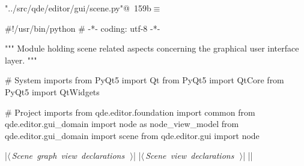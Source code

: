 \documentclass[%
    a4paper,    %
    justified,  %
    nobib,      %
    openany     %
]{tufte-book}
\begin{document}
\begin{flushleft} \small
\begin{minipage}{\linewidth}\label{scrap174}\raggedright\small
{} \verb@"../src/qde/editor/gui/scene.py"@\nobreak\ {\footnotesize {159b}}$\equiv$
\vspace{-1ex}
\begin{pythoncode}
#!/usr/bin/python
# -*- coding: utf-8 -*-

""" Module holding scene related aspects concerning the graphical user interface layer.
"""

# System imports
from PyQt5 import Qt
from PyQt5 import QtCore
from PyQt5 import QtWidgets

# Project imports
from qde.editor.foundation import common
from qde.editor.gui_domain import node as node_view_model
from qde.editor.gui_domain import scene
from qde.editor.gui import node

|\hbox{$\langle\,${\itshape Scene graph view declarations}\nobreak\ {\footnotesize {}}$\,\rangle$}|
|\hbox{$\langle\,${\itshape Scene view declarations}\nobreak\ {\footnotesize {}}$\,\rangle$}|
|\NWsep|
\end{pythoncode}
\vspace{1.5ex}
\footnotesize
\begin{list}{}{\setlength{\itemsep}{-\parsep}\setlength{\itemindent}{-\leftmargin}}

\item{}
\end{list}
\end{minipage}\vspace{4ex}
\end{flushleft}
\end{document}
